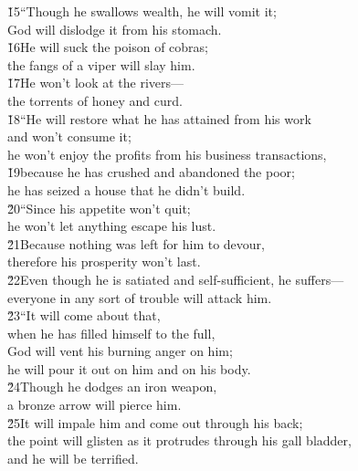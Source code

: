 \begin{poetry}
\poeml \v{15}``Though he swallows wealth, he will vomit it; \\
\poemll    God will dislodge it from his stomach. \\
\poeml \v{16}He will suck the poison of cobras; \\
\poemll    the fangs of a viper will slay him. \\
\poeml \v{17}He won't look at the rivers--- \\
\poemll    the torrents of honey and curd. \\
\poeml \v{18}``He will restore what he has attained from his work \\
\poemll    and won't consume it; \\
\poemlll       he won't enjoy the profits from his business transactions, \\
\poeml \v{19}because he has crushed and abandoned the poor; \\
\poemll    he has seized a house that he didn't build. \\
\poeml \v{20}``Since his appetite won't quit; \\
\poemll    he won't let anything escape his lust. \\
\poeml \v{21}Because nothing was left for him to devour, \\
\poemll    therefore his prosperity won't last. \\
\poeml \v{22}Even though he is satiated and self-sufficient, he suffers--- \\
\poemll    everyone in any sort of trouble will attack him. \\
\poeml \v{23}``It will come about that, \\
\poemll    when he has filled himself to the full, \\
\poeml God will vent his burning anger on him; \\
\poemll    he will pour it out on him and on his body. \\
\poeml \v{24}Though he dodges an iron weapon, \\
\poemll    a bronze arrow will pierce him. \\
\poeml \v{25}It will impale him and come out through his back; \\
\poemll    the point will glisten as it protrudes through his gall bladder, \\
\poemlll       and he will be terrified. \\

\end{poetry}
